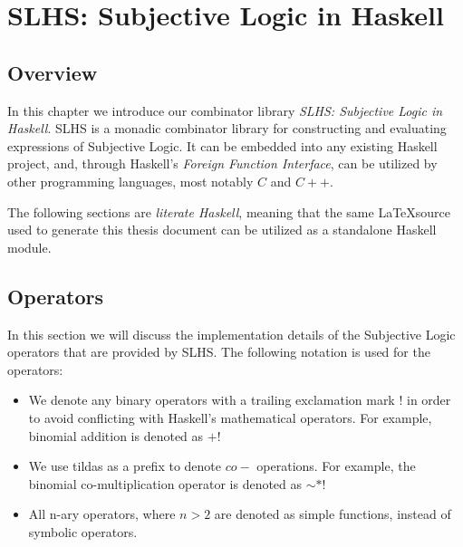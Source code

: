 \documentclass[thesis.tex]{subfiles}
\begin{document}
\chapter{SLHS: Subjective Logic in Haskell}

\section{Overview}

In this chapter we introduce our combinator library \emph{SLHS: Subjective Logic
in Haskell}. SLHS is a monadic combinator library for constructing and evaluating
expressions of Subjective Logic. It can be embedded into any existing Haskell
project, and, through Haskell's \emph{Foreign Function Interface}, can be utilized
by other programming languages, most notably $C$ and $C++$.

The following sections are \emph{literate Haskell}, meaning that the same
\LaTeX source used to generate this thesis document can be utilized as a standalone
Haskell module.

%
%






%



\section{Operators}

In this section we will discuss the implementation details of the Subjective Logic
operators that are provided by SLHS. The following notation is used for the operators:

\begin{itemize}
  \item We denote any binary operators with a trailing exclamation mark $!$ in order to
    avoid conflicting with Haskell's mathematical operators. For example, binomial addition
    is denoted as $+!$
  \item We use tildas as a prefix to denote $co-$ operations. For example, the binomial
    co-multiplication operator is denoted as $\sim *!$
  \item All n-ary operators, where $n > 2$ are denoted as simple functions, instead of
    symbolic operators.
\end{itemize}







\end{document}
